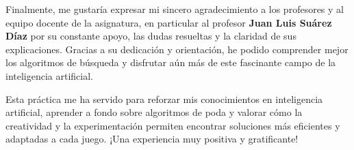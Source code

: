 Finalmente, me gustaría expresar mi sincero agradecimiento a los profesores y al equipo docente de la asignatura, en particular al profesor \textbf{Juan Luis Suárez Díaz} por su constante apoyo, las dudas resueltas y la claridad de sus explicaciones. Gracias a su dedicación y orientación, he podido comprender mejor los algoritmos de búsqueda y disfrutar aún más de este fascinante campo de la inteligencia artificial.

Esta práctica me ha servido para reforzar mis conocimientos en inteligencia artificial, aprender a fondo sobre algoritmos de poda y valorar cómo la creatividad y la experimentación permiten encontrar soluciones más eficientes y adaptadas a cada juego. ¡Una experiencia muy positiva y gratificante!
